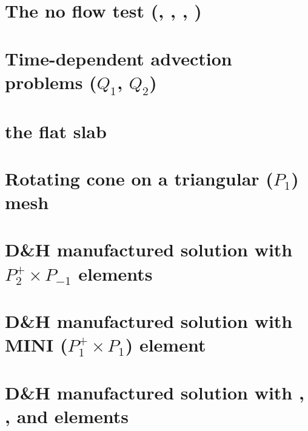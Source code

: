 \documentclass[a4paper,11pt]{report}
\begin{document}
\chapter{The no flow test (\QonePzero, \QtwoQone, \QthreeQtwo, \QfourQthree)\label{f42}} %

\chapter{Time-dependent advection problems ($Q_1$, $Q_2$)\label{f43}} %

\chapter{the flat slab \label{f44}} %

\chapter{Rotating cone on a triangular ($P_1$) mesh\label{f45}} %

\chapter{D\&H manufactured solution with $P_2^+\times P_{-1}$ elements \label{f46}} %

\chapter{D\&H manufactured solution with MINI ($P_1^+\times P_1$) element \label{f47}} %

\chapter{D\&H manufactured solution with \QonePzero, \QtwoQone, \QthreeQtwo and \QfourQthree elements \label{f48}} %
\end{document}

